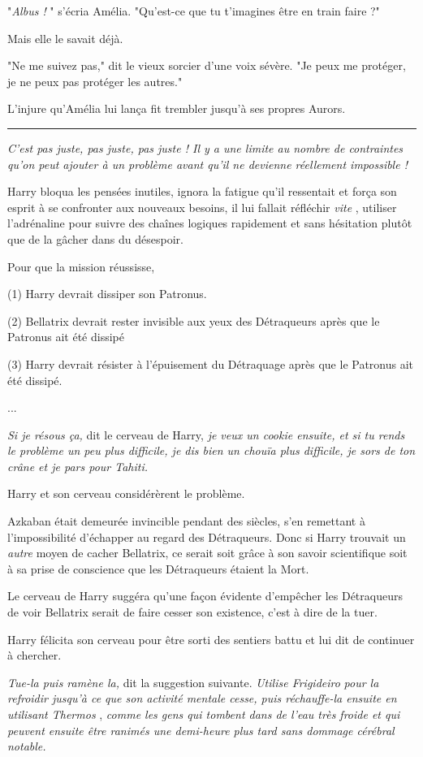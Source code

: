 "\emph{Albus !} " s'écria Amélia. "Qu'est-ce que tu t'imagines être en train faire ?"

Mais elle le savait déjà.

"Ne me suivez pas," dit le vieux sorcier d'une voix sévère. "Je peux me protéger, je ne peux pas protéger les autres."

L'injure qu'Amélia lui lança fit trembler jusqu'à ses propres Aurors.
\par\noindent\rule{\textwidth}{0.4pt}
\emph{C'est pas juste, pas juste, pas juste ! Il y a une limite au nombre de contraintes qu'on peut ajouter à un problème avant qu'il ne devienne réellement impossible !} 

Harry bloqua les pensées inutiles, ignora la fatigue qu'il ressentait et força son esprit à se confronter aux nouveaux besoins, il lui fallait réfléchir \emph{vite} , utiliser l'adrénaline pour suivre des chaînes logiques rapidement et sans hésitation plutôt que de la gâcher dans du désespoir.

Pour que la mission réussisse,

(1) Harry devrait dissiper son Patronus.

(2) Bellatrix devrait rester invisible aux yeux des Détraqueurs après que le Patronus ait été dissipé

(3) Harry devrait résister à l'épuisement du Détraquage après que le Patronus ait été dissipé.

...

\emph{Si je résous ça, } dit le cerveau de Harry, \emph{je veux un cookie ensuite, et si tu rends le problème un peu plus difficile, je dis bien un chouïa plus difficile, je sors de ton crâne et je pars pour Tahiti.} 

Harry et son cerveau considérèrent le problème.

Azkaban était demeurée invincible pendant des siècles, s'en remettant à l'impossibilité d'échapper au regard des Détraqueurs. Donc si Harry trouvait un \emph{autre}  moyen de cacher Bellatrix, ce serait soit grâce à son savoir scientifique soit à sa prise de conscience que les Détraqueurs étaient la Mort.

Le cerveau de Harry suggéra qu'une façon évidente d'empêcher les Détraqueurs de voir Bellatrix serait de faire cesser son existence, c'est à dire de la tuer.

Harry félicita son cerveau pour être sorti des sentiers battu et lui dit de continuer à chercher.

\emph{Tue-la puis ramène la,}  dit la suggestion suivante. \emph{Utilise Frigideiro}  \emph{pour la refroidir jusqu'à ce que son activité mentale cesse, puis réchauffe-la ensuite en utilisant Thermos} , \emph{comme les gens qui tombent dans de l'eau très froide et qui peuvent ensuite être ranimés une demi-heure plus tard sans dommage cérébral notable.} 

